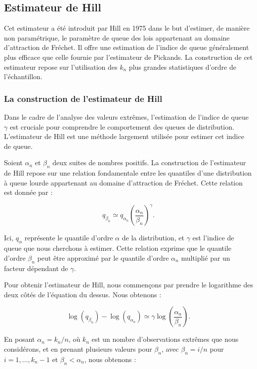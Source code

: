 \documentclass{article}
\theoremstyle{plain}
\theoremstyle{definition}
\theoremstyle{plain}
\begin{document}
\subsection{Estimateur de Hill}

\noindent Cet estimateur a été introduit par Hill en 1975 dans le but d’estimer, de manière non paramétrique, le paramètre de queue des lois appartenant au domaine d’attraction de Fréchet. Il offre une estimation de l’indice de queue généralement plus efficace que celle fournie par l’estimateur de Pickands. La construction de cet estimateur repose sur l’utilisation des $k_n$ plus grandes statistiques d’ordre de l’échantillon.



\subsubsection{La construction de l’estimateur de Hill}
\noindent Dans le cadre de l'analyse des valeurs extrêmes, l'estimation de l'indice de queue \(\gamma\) est cruciale pour comprendre le comportement des queues de distribution. L'estimateur de Hill est une méthode largement utilisée pour estimer cet indice de queue.

\noindent Soient \(\alpha_n\) et \(\beta_n\) deux suites de nombres positifs. La construction de l'estimateur de Hill repose sur une relation fondamentale entre les quantiles d’une distribution à queue lourde appartenant au domaine d’attraction de Fréchet. Cette relation est donnée par :

\[
    q_{\beta_n} \simeq q_{\alpha_n} \left( \frac{\alpha_n}{\beta_n} \right)^{\gamma}.
\]

\noindent Ici, \(q_{\alpha}\) représente le quantile d'ordre \(\alpha\) de la distribution, et \(\gamma\) est l'indice de queue que nous cherchons à estimer. Cette relation exprime que le quantile d'ordre \(\beta_n\) peut être approximé par le quantile d'ordre \(\alpha_n\) multiplié par un facteur dépendant de \(\gamma\).

\noindent Pour obtenir l'estimateur de Hill, nous commençons par prendre le logarithme des deux côtés de l'équation du dessus. Nous obtenons :

\[
\log(q_{\beta_n}) - \log(q_{\alpha_n}) \simeq \gamma \log\left( \frac{\alpha_n}{\beta_n} \right).
\]

\noindent En posant $\alpha_n = k_n/n$, où \(k_n\) est un nombre d'observations extrêmes que nous considérons, et en prenant plusieurs valeurs pour \(\beta_n\), avec \(\beta_n = i/n\) pour \(i = 1, \ldots, k_n - 1\) et \(\beta_n < \alpha_n\), nous obtenons :
\end{document}
